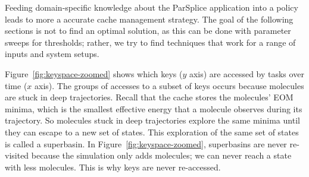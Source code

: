 %
%
%
%
%
%

Feeding domain-specific knowledge about the ParSplice application into a policy
leads to more a accurate cache management strategy.  The goal of the following
sections is not to find an optimal solution, as this can be done with parameter
sweeps for thresholds; rather, we try to find techniques that work for a range
of inputs and system setups.

Figure~\ref{fig:keyspace-zoomed} shows which keys (\(y\) axis) are accessed by
tasks over time (\(x\) axis). The groups of accesses to a subset of keys occurs
because molecules are stuck in deep trajectories. Recall that the cache stores
the molecules' EOM minima, which is the smallest effective energy that a
molecule observes during its trajectory. So molecules stuck in deep
trajectories explore the same minima until they can escape to a new set of
states. This exploration of the same set of states is called a superbasin.  In
Figure~\ref{fig:keyspace-zoomed}, superbasins are never re-visited because the
simulation only adds molecules; we can never reach a state with less molecules.
This is why keys are never re-accessed.  

